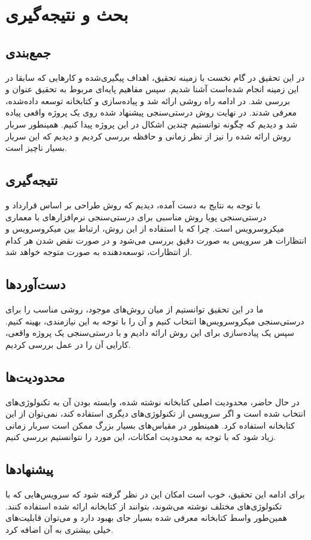 \chapter{بحث و نتیجه‌گیری}
\section{جمع‌بندی}
در این تحقیق در گام نخست با زمینه تحقیق، اهداف پیگیری‌شده و کارهایی که سابقا در این زمینه انجام شده‌است آشنا شدیم. سپس مفاهیم پایه‌ای مربوط به تحقیق عنوان و بررسی شد. در ادامه راه روشی ارائه شد و پیاده‌سازی‌ و کتابخانه توسعه داده‌شده، معرفی شدند. در نهایت روش درستی‌سنجی پیشنهاد شده روی یک پروژه واقعی پیاده شد و دیدیم که چگونه توانستیم چندین اشکال در این پروژه پیدا کنیم. همینطور سربار روش ارائه شده را نیز از نظر زمانی و حافظه بررسی کردیم و دیدیم که این سربار بسیار ناچیز است.

\section{نتیجه‌گیری}
با توجه به نتایج به دست آمده، دیدیم که روش طراحی بر اساس قرارداد و درستی‌سنجی پویا روش مناسبی برای درستی‌سنجی نرم‌افزارهای با معماری میکروسرویس است. چرا که با استفاده از این روش، ارتباط بین میکروسرویس‌ و انتظارات هر سرویس به صورت دقیق بررسی می‌شود و در صورت نقض شدن هر کدام از انتظارات، توسعه‌دهنده به صورت متوجه خواهد شد.

\section{دست‌آورد‌ها}
ما در این تحقیق توانستیم از میان روش‌های موجود، روشی مناسب را برای درستی‌سنجی میکروسرویس‌ها انتخاب کنیم و آن را با توجه به این نیازمندی، بهینه کنیم. سپس یک پیاده‌سازی برای این روش ارائه دادیم و با درستی‌سنجی یک پروژه واقعی، کارایی آن را در عمل بررسی کردیم.

\section{محدودیت‌ها}
در حال حاضر، محدودیت اصلی کتابخانه نوشته شده، وابسته بودن آن به تکنولوژی‌های انتخاب شده است و اگر سرویسی از تکنولوژی‌های دیگری استفاده کند، نمی‌توان از این کتابخانه استفاده کرد. همینطور در مقیاس‌های بسیار بزرگ ممکن است سربار زمانی زیاد شود که با توجه به محدودیت امکانات، این مورد را نتوانستیم بررسی کنیم.

\section{پیشنهادها}
برای ادامه این تحقیق، خوب است امکان این در نظر گرفته شود که سرویس‌هایی که با تکنولوژی‌های مختلف نوشته می‌شوند، بتوانند از کتابخانه ارائه شده استفاده کنند. همین‌طور واسط کتابخانه معرفی شده بسیار جای بهبود دارد و می‌توان قابلیت‌های خیلی بیشتری به آن اضافه کرد.
